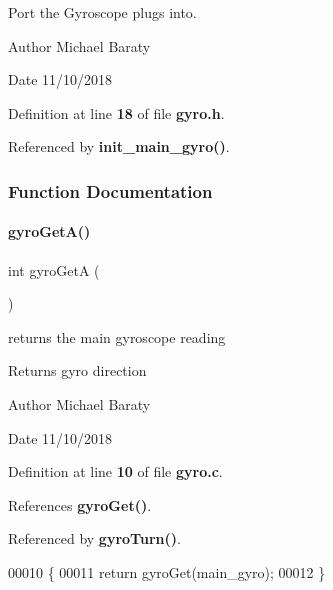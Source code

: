 Port the Gyroscope plugs into. 

\begin{DoxyAuthor}{Author}
Michael Baraty 
\end{DoxyAuthor}
\begin{DoxyDate}{Date}
11/10/2018 
\end{DoxyDate}


Definition at line \textbf{ 18} of file \textbf{ gyro.\+h}.



Referenced by \textbf{ init\+\_\+main\+\_\+gyro()}.



\subsubsection{Function Documentation}
\mbox{\label{gyro_8h_a5a5a31229f1d815f1b9ebd4ddd1a58ff}} 
\paragraph{gyro\+Get\+A()}
{\footnotesize\ttfamily int gyro\+GetA (\begin{DoxyParamCaption}{ }\end{DoxyParamCaption})}



returns the main gyroscope reading 

\begin{DoxyReturn}{Returns}
gyro direction 
\end{DoxyReturn}
\begin{DoxyAuthor}{Author}
Michael Baraty 
\end{DoxyAuthor}
\begin{DoxyDate}{Date}
11/10/2018 
\end{DoxyDate}


Definition at line \textbf{ 10} of file \textbf{ gyro.\+c}.



References \textbf{ gyro\+Get()}.



Referenced by \textbf{ gyro\+Turn()}.


\begin{DoxyCode}
00010                \{
00011   \textcolor{keywordflow}{return} gyroGet(main\_gyro);
00012 \}
\end{DoxyCode}
\mbox{\label{gyro_8h_a648e011460fe66e7157657d8c22578e9}} 
